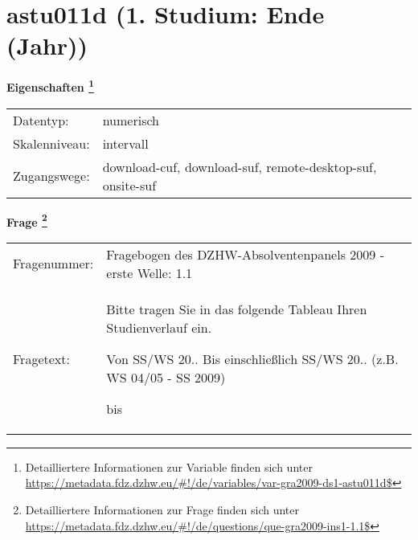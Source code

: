 
    \setcounter{footnote}{0}

    \vspace*{-1.8cm}
	\section{astu011d (1. Studium: Ende (Jahr))}
	\label{section:astu011d}



    \vspace*{0.5cm}
    \noindent\textbf{Eigenschaften
	\footnote{Detailliertere Informationen zur Variable finden sich unter
		\url{https://metadata.fdz.dzhw.eu/\#!/de/variables/var-gra2009-ds1-astu011d$}}}\\
	\begin{tabularx}{\hsize}{@{}lX}
	Datentyp: & numerisch \\
	Skalenniveau: & intervall \\
	Zugangswege: &
	  download-cuf, 
	  download-suf, 
	  remote-desktop-suf, 
	  onsite-suf
 \\
    \end{tabularx}



				\vspace*{0.5cm}
                \noindent\textbf{Frage
	                \footnote{Detailliertere Informationen zur Frage finden sich unter
		              \url{https://metadata.fdz.dzhw.eu/\#!/de/questions/que-gra2009-ins1-1.1$}}}\\
				\begin{tabularx}{\hsize}{@{}lX}
					Fragenummer: &
					  Fragebogen des DZHW-Absolventenpanels 2009 - erste Welle:
					  1.1
 \\
					Fragetext: & Bitte tragen Sie in das folgende Tableau Ihren Studienverlauf ein.\par  Von SS/WS 20.. Bis einschließlich SS/WS 20.. (z.B. WS 04/05 - SS 2009)\par  bis \\
				\end{tabularx}





